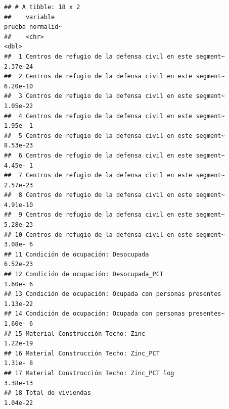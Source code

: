 \documentclass[11pt,]{article}
\newenvironment{Shaded}{\begin{snugshade}}{\end{snugshade}}
\newcommand{\KeywordTok}[1]{\textcolor[rgb]{0.13,0.29,0.53}{\textbf{#1}}}
\newcommand{\DataTypeTok}[1]{\textcolor[rgb]{0.13,0.29,0.53}{#1}}
\newcommand{\StringTok}[1]{\textcolor[rgb]{0.31,0.60,0.02}{#1}}
\newcommand{\OperatorTok}[1]{\textcolor[rgb]{0.81,0.36,0.00}{\textbf{#1}}}
\newcommand{\NormalTok}[1]{#1}
\begin{document}
\begin{Shaded}
\end{Shaded}

\begin{verbatim}
## # A tibble: 18 x 2
##    variable                                                prueba_normalid~
##    <chr>                                                              <dbl>
##  1 Centros de refugio de la defensa civil en este segment~         2.37e-24
##  2 Centros de refugio de la defensa civil en este segment~         6.20e-10
##  3 Centros de refugio de la defensa civil en este segment~         1.05e-22
##  4 Centros de refugio de la defensa civil en este segment~         1.95e- 1
##  5 Centros de refugio de la defensa civil en este segment~         8.53e-23
##  6 Centros de refugio de la defensa civil en este segment~         4.45e- 1
##  7 Centros de refugio de la defensa civil en este segment~         2.57e-23
##  8 Centros de refugio de la defensa civil en este segment~         4.91e-10
##  9 Centros de refugio de la defensa civil en este segment~         5.28e-23
## 10 Centros de refugio de la defensa civil en este segment~         3.08e- 6
## 11 Condición de ocupación: Desocupada                              6.52e-23
## 12 Condición de ocupación: Desocupada_PCT                          1.60e- 6
## 13 Condición de ocupación: Ocupada con personas presentes          1.13e-22
## 14 Condición de ocupación: Ocupada con personas presentes~         1.60e- 6
## 15 Material Construcción Techo: Zinc                               1.22e-19
## 16 Material Construcción Techo: Zinc_PCT                           1.31e- 8
## 17 Material Construcción Techo: Zinc_PCT log                       3.38e-13
## 18 Total de viviendas                                              1.04e-22
\end{verbatim}

\begin{Shaded}
\end{Shaded}
\end{document}
